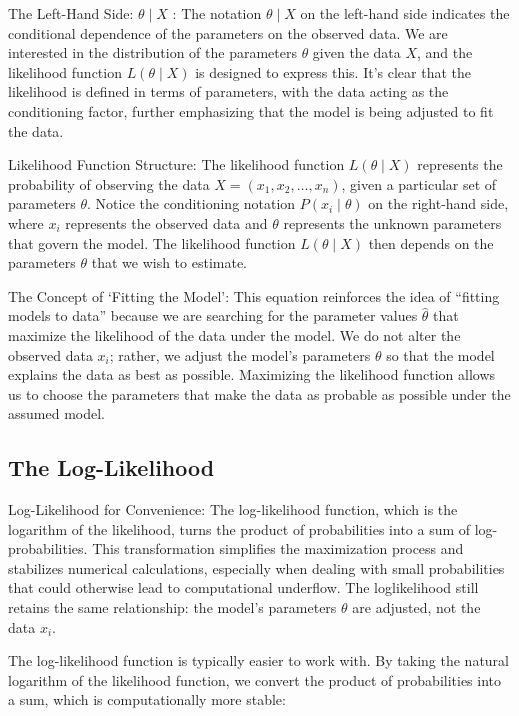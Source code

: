 \documentclass[
  12 pt,
  a4paper,
]{book}
\numberwithin{equation}{section}
\theoremstyle{plain}      %
\theoremstyle{definition} %
\theoremstyle{remark}     %
\theoremstyle{note}         %
\begin{document}
The Left-Hand Side: \(\theta \mid X\) : The notation \(\theta \mid X\)
on the left-hand side indicates the conditional dependence of the
parameters on the observed data. We are interested in the distribution
of the parameters \(\theta\) given the data \(X\), and the likelihood
function \(L(\theta \mid X)\) is designed to express this. It's clear
that the likelihood is defined in terms of parameters, with the data
acting as the conditioning factor, further emphasizing that the model is
being adjusted to fit the data.

Likelihood Function Structure: The likelihood function
\(L(\theta \mid X)\) represents the probability of observing the data
\(X=\left(x_1, x_2, \ldots, x_n\right)\), given a particular set of
parameters \(\theta\). Notice the conditioning notation
\(P\left(x_i \mid \theta\right)\) on the right-hand side, where \(x_i\)
represents the observed data and \(\theta\) represents the unknown
parameters that govern the model. The likelihood function
\(L(\theta \mid X)\) then depends on the parameters \(\theta\) that we
wish to estimate.

The Concept of `Fitting the Model': This equation reinforces the idea of
``fitting models to data'' because we are searching for the parameter
values \(\hat{\theta}\) that maximize the likelihood of the data under
the model. We do not alter the observed data \(x_i\); rather, we adjust
the model's parameters \(\theta\) so that the model explains the data as
best as possible. Maximizing the likelihood function allows us to choose
the parameters that make the data as probable as possible under the
assumed model.

\hypertarget{the-log-likelihood}{%
\subsection{The Log-Likelihood}\label{the-log-likelihood}}

Log-Likelihood for Convenience: The log-likelihood function, which is
the logarithm of the likelihood, turns the product of probabilities into
a sum of log-probabilities. This transformation simplifies the
maximization process and stabilizes numerical calculations, especially
when dealing with small probabilities that could otherwise lead to
computational underflow. The loglikelihood still retains the same
relationship: the model's parameters \(\theta\) are adjusted, not the
data \(x_i\).

The log-likelihood function is typically easier to work with. By taking
the natural logarithm of the likelihood function, we convert the product
of probabilities into a sum, which is computationally more stable:
\end{document}
